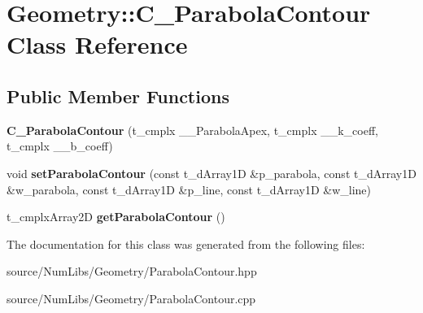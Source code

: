 \hypertarget{class_geometry_1_1_c___parabola_contour}{\section{Geometry\-:\-:C\-\_\-\-Parabola\-Contour Class Reference}
\label{class_geometry_1_1_c___parabola_contour}
}
\subsection*{Public Member Functions}
\begin{DoxyCompactItemize}
\item 
\hypertarget{class_geometry_1_1_c___parabola_contour_aa0c00c9315f7d61dd1731074e0846dba}{{\bfseries C\-\_\-\-Parabola\-Contour} (t\-\_\-cmplx \-\_\-\-\_\-\-Parabola\-Apex, t\-\_\-cmplx \-\_\-\-\_\-k\-\_\-coeff, t\-\_\-cmplx \-\_\-\-\_\-b\-\_\-coeff)}\label{class_geometry_1_1_c___parabola_contour_aa0c00c9315f7d61dd1731074e0846dba}

\item 
\hypertarget{class_geometry_1_1_c___parabola_contour_a578b2b2d45be66ef6effe03cbf047a7a}{void {\bfseries set\-Parabola\-Contour} (const t\-\_\-d\-Array1\-D \&p\-\_\-parabola, const t\-\_\-d\-Array1\-D \&w\-\_\-parabola, const t\-\_\-d\-Array1\-D \&p\-\_\-line, const t\-\_\-d\-Array1\-D \&w\-\_\-line)}\label{class_geometry_1_1_c___parabola_contour_a578b2b2d45be66ef6effe03cbf047a7a}

\item 
\hypertarget{class_geometry_1_1_c___parabola_contour_a32867584ce7dfc8234a3446fa803c23f}{t\-\_\-cmplx\-Array2\-D {\bfseries get\-Parabola\-Contour} ()}\label{class_geometry_1_1_c___parabola_contour_a32867584ce7dfc8234a3446fa803c23f}

\end{DoxyCompactItemize}


The documentation for this class was generated from the following files\-:\begin{DoxyCompactItemize}
\item 
source/\-Num\-Libs/\-Geometry/Parabola\-Contour.\-hpp\item 
source/\-Num\-Libs/\-Geometry/Parabola\-Contour.\-cpp\end{DoxyCompactItemize}
